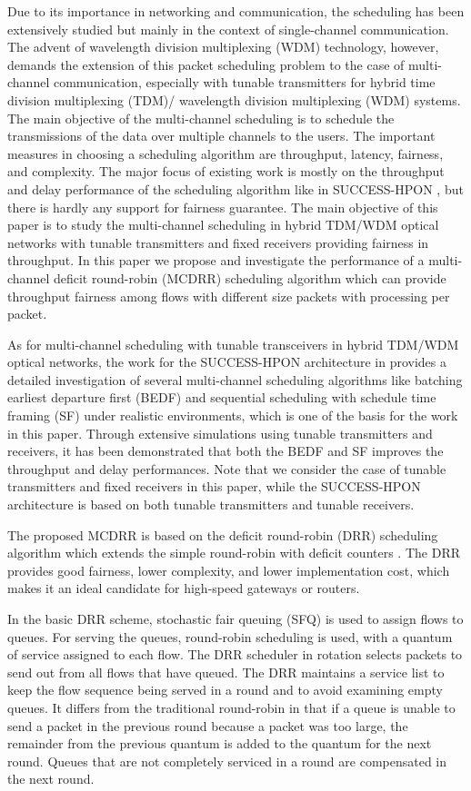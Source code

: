 \documentclass[conference,letterpaper]{IEEEtran}
\begin{document}
Due to its importance in networking and communication, the scheduling has been
extensively studied but mainly in the context of single-channel
communication. The advent of wavelength division multiplexing (WDM) technology,
however, demands the extension of this packet scheduling problem to the case of
multi-channel communication, especially with tunable transmitters for hybrid
time division multiplexing (TDM)/ wavelength division multiplexing (WDM) systems. 
The main objective of the multi-channel scheduling is to schedule the transmissions 
of the data over multiple channels to the users. The important measures in choosing a scheduling
algorithm are throughput, latency, fairness, and complexity. The major focus of
existing work is mostly on the throughput and delay performance of the
scheduling algorithm like in SUCCESS-HPON \cite{Kim:05-1}, but there is hardly
any support for fairness guarantee. The main objective of this paper is to study
the multi-channel scheduling in hybrid TDM/WDM optical networks with tunable
transmitters and fixed receivers providing fairness in throughput. In this paper
we propose and investigate the performance of a multi-channel deficit
round-robin (MCDRR) scheduling algorithm which can provide throughput fairness
among flows with different size packets with  processing per packet.

As for multi-channel scheduling with tunable transceivers in hybrid TDM/WDM
optical networks, the work for the SUCCESS-HPON architecture in \cite{Kim:05-1}
provides a detailed investigation of several multi-channel scheduling algorithms
like batching earliest departure first (BEDF) and sequential scheduling with
schedule time framing (SF) under realistic environments, which is one of the
basis for the work in this paper. Through extensive simulations using tunable
transmitters and receivers, it has been demonstrated that both the BEDF and
SF improves the throughput and delay performances. Note that we consider the
case of tunable transmitters and fixed receivers in this paper, while the
SUCCESS-HPON architecture is based on both tunable transmitters and tunable
receivers.

The proposed MCDRR is based on the deficit round-robin (DRR) scheduling
algorithm which extends the simple round-robin with deficit counters
\cite{Shreedhar:95-1}. The DRR provides good fairness, lower complexity, and
lower implementation cost, which makes it an ideal candidate for high-speed
gateways or routers.

In the basic DRR scheme, stochastic fair queuing (SFQ) \cite{mckenney91:_stoch}
is used to assign flows to queues. For serving the queues, round-robin
scheduling is used, with a quantum of service assigned to each flow. The DRR
scheduler in rotation selects packets to send out from all flows that have
queued. The DRR maintains a service list to keep the flow sequence being served
in a round and to avoid examining empty queues. It differs from the traditional
round-robin in that if a queue is unable to send a packet in the previous round
because a packet was too large, the remainder from the previous quantum is added
to the quantum for the next round. Queues that are not completely serviced in a
round are compensated in the next round.
\end{document}
